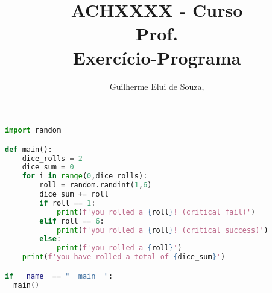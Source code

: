 \documentclass[12pt,a4paper]{article}
\begin{document}
\author{Guilherme Elui de Souza,  }
\title{ACHXXXX - Curso \\
\large Prof.  \\
\large Exercício-Programa }
\maketitle

\begin{lstlisting}[language=Python]
import random

def main():
    dice_rolls = 2
    dice_sum = 0
    for i in range(0,dice_rolls):
        roll = random.randint(1,6)
        dice_sum += roll
        if roll == 1:
            print(f'you rolled a {roll}! (critical fail)')
        elif roll == 6:
            print(f'you rolled a {roll}! (critical success)')
        else:
            print(f'you rolled a {roll}')
    print(f'you have rolled a total of {dice_sum}')

if __name__== "__main__":
  main()
\end{lstlisting}
\end{document}
